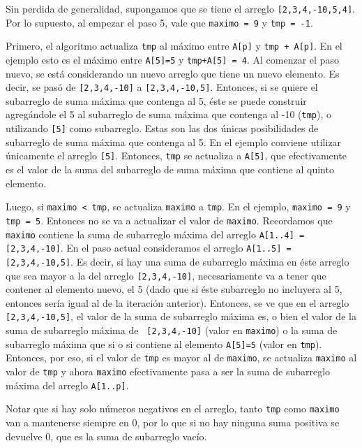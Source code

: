 Sin perdida de generalidad, supongamos que se tiene el arreglo \texttt{[2,3,4,-10,5,4]}. Por lo supuesto, al empezar el paso 5, vale que \texttt{maximo = 9} y \texttt{tmp = -1}.

Primero, el algoritmo actualiza \texttt{tmp} al máximo entre \texttt{A[p]} y  \texttt{tmp + A[p]}. En el ejemplo esto es el máximo entre \texttt{A[5]=5} y \texttt{tmp+A[5] = 4}. Al comenzar el paso nuevo, se está considerando un nuevo arreglo que tiene un nuevo elemento. Es decir, se pasó de \texttt{[2,3,4,-10]} a \texttt{[2,3,4,-10,5]}. Entonces, si se quiere el subarreglo de suma máxima que contenga al 5, éste se puede construir agregándole el 5 al subarreglo de suma máxima que contenga al -10 (\texttt{tmp}), o utilizando \texttt{[5]} como subarreglo. Estas son las dos únicas posibilidades de subarreglo de suma máxima que contenga al 5. En el ejemplo conviene utilizar únicamente el arreglo \texttt{[5]}. Entonces, \texttt{tmp} se actualiza a \texttt{A[5]}, que efectivamente es el valor de la suma del subarreglo de suma máxima que contiene al quinto elemento.

Luego, si \texttt{maximo < tmp}, se actualiza \texttt{maximo} a \texttt{tmp}. En el ejemplo, \texttt{maximo = 9} y \texttt{tmp = 5}. Entonces no se va a actualizar el valor de \texttt{maximo}. Recordamos que \texttt{maximo} contiene la suma de subarreglo máxima del arreglo \texttt{A[1..4] = [2,3,4,-10]}. En el paso actual consideramos el arreglo \texttt{A[1..5] = [2,3,4,-10,5]}. Es decir, si hay una suma de subarreglo máxima en éste arreglo que sea mayor a la del arreglo \texttt{[2,3,4,-10]}, necesariamente va a tener que contener al elemento nuevo, el 5 (dado que si éste subarreglo no incluyera al 5, entonces sería igual al de la iteración anterior). Entonces, se ve que en el arreglo \texttt{[2,3,4,-10,5]}, el valor de la suma de subarreglo máxima es, o bien el valor de la suma de subarreglo máxima de \texttt{ [2,3,4,-10]} (valor en \texttt{maximo}) o la suma de subarreglo máxima que si o si contiene al elemento \texttt{A[5]=5} (valor en \texttt{tmp}). Entonces, por eso, si el valor de \texttt{tmp} es mayor al de \texttt{maximo}, se actualiza \texttt{maximo} al valor de \texttt{tmp} y ahora \texttt{maximo} efectivamente pasa a ser la suma de subarreglo máxima del arreglo \texttt{A[1..p]}.

Notar que si hay solo números negativos en el arreglo, tanto \texttt{tmp} como \texttt{maximo} van a mantenerse siempre en 0, por lo que si no hay ninguna suma positiva se devuelve 0, que es la suma de subarreglo vacío.

